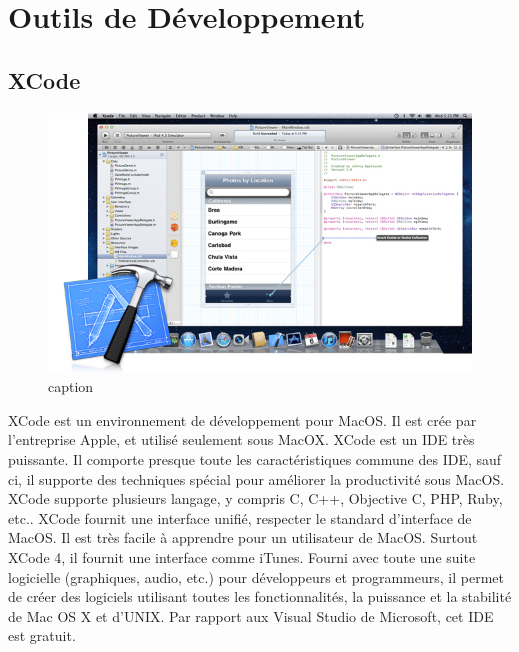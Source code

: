 
\section{Outils de Développement} %
\label{sec:outils_de_développement}

\subsection{XCode} %
\label{sub:xcode}

\begin{figure}[htbp]
	\centering
		\includegraphics[width=6in]{Image/tools_overview_xcode_20110711.jpg}
	\caption{caption}
	\label{fig:Image_tools_overview_xcode_20110711}
\end{figure}

XCode est un environnement de développement pour MacOS. Il est crée par l'entreprise Apple, et utilisé seulement sous MacOX. XCode est un IDE très puissante. Il comporte presque toute les caractéristiques commune des IDE, sauf ci, il supporte des techniques spécial pour améliorer la productivité sous MacOS. XCode supporte plusieurs langage, y compris C, C++, Objective C, PHP, Ruby, etc.. XCode fournit une interface unifié, respecter le standard d'interface de MacOS. Il est très facile à apprendre pour un utilisateur de MacOS. Surtout XCode 4, il fournit une interface comme iTunes. Fourni avec toute une suite logicielle (graphiques, audio, etc.) pour développeurs et programmeurs, il permet de créer des logiciels utilisant toutes les fonctionnalités, la puissance et la stabilité de Mac OS X et d'UNIX. Par rapport aux Visual Studio de Microsoft, cet IDE est gratuit.

